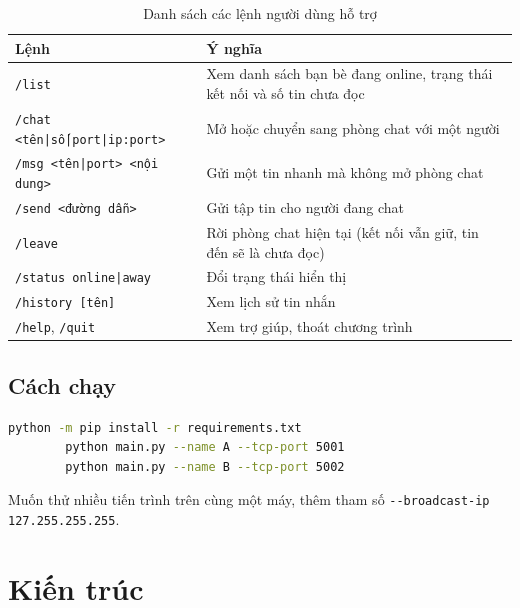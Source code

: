 \documentclass[a4paper,12pt]{article}
\newcommand{\code}[1]{\texttt{#1}}
\begin{document}
	\begin{table}[H]
		\centering
		\small
		\renewcommand{\arraystretch}{1.35}
		\begin{tabularx}{\textwidth}{|>{\raggedright\arraybackslash}p{4.8cm}|X|}
			\hline
			\rowcolor{blue!12}
			\textcolor{blue!80!black}{\textbf{Lệnh}} & \textcolor{blue!80!black}{\textbf{Ý nghĩa}} \\
			\hline
			\code{/list} & Xem danh sách bạn bè đang online, trạng thái kết nối và số tin chưa đọc \\
			\hline
			\code{/chat <tên|số|port|ip:port>} & Mở hoặc chuyển sang phòng chat với một người \\
			\hline
			\code{/msg <tên|port> <nội dung>} & Gửi một tin nhanh mà không mở phòng chat \\
			\hline
			\code{/send <đường dẫn>} & Gửi tập tin cho người đang chat \\
			\hline
			\code{/leave} & Rời phòng chat hiện tại (kết nối vẫn giữ, tin đến sẽ là chưa đọc) \\
			\hline
			\code{/status online|away} & Đổi trạng thái hiển thị \\
			\hline
			\code{/history [tên]} & Xem lịch sử tin nhắn \\
			\hline
			\code{/help}, \code{/quit} & Xem trợ giúp, thoát chương trình \\
			\hline
		\end{tabularx}
		\caption{Danh sách các lệnh người dùng hỗ trợ}
		\label{tab:user_commands}
	\end{table}
	
	\subsection{Cách chạy}
	\begin{lstlisting}[language=bash, caption={Lệnh cài đặt thư viện tùy chọn và khởi chạy ứng dụng}]
		python -m pip install -r requirements.txt
		python main.py --name A --tcp-port 5001
		python main.py --name B --tcp-port 5002
	\end{lstlisting}
	Muốn thử nhiều tiến trình trên cùng một máy, thêm tham số \code{-\/-broadcast-ip 127.255.255.255}.
	
	\section{Kiến trúc}
	
\end{document}
